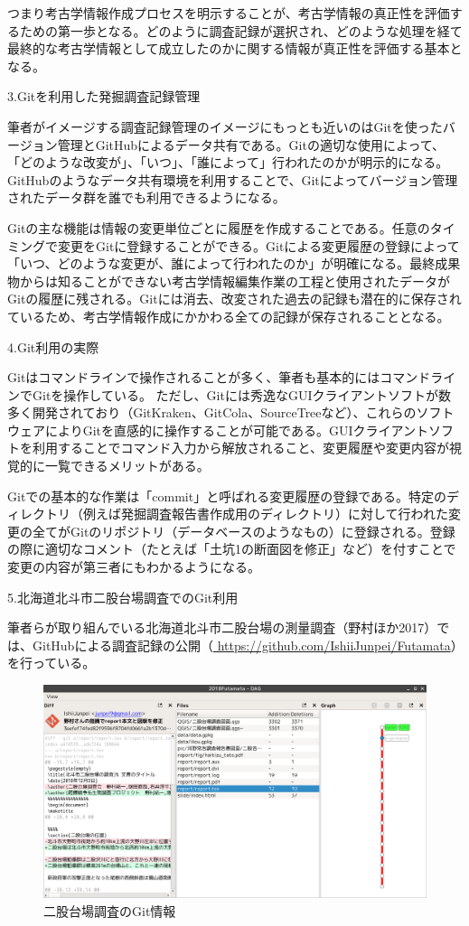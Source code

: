 \documentclass[9pt,b5j,papersize]{jsarticle}
\begin{document}
\begin{multicols}{2}
つまり考古学情報作成プロセスを明示することが、考古学情報の真正性を評価するための第一歩となる。どのように調査記録が選択され、どのような処理を経て最終的な考古学情報として成立したのかに関する情報が真正性を評価する基本となる。

\noindent
{\large 3.Gitを利用した発掘調査記録管理}

筆者がイメージする調査記録管理のイメージにもっとも近いのはGitを使ったバージョン管理とGitHubによるデータ共有である。Gitの適切な使用によって、「どのような改変が」、「いつ」、「誰によって」行われたのかが明示的になる。GitHubのようなデータ共有環境を利用することで、Gitによってバージョン管理されたデータ群を誰でも利用できるようになる。

Gitの主な機能は情報の変更単位ごとに履歴を作成することである。任意のタイミングで変更をGitに登録することができる。Gitによる変更履歴の登録によって「いつ、どのような変更が、誰によって行われたのか」が明確になる。最終成果物からは知ることができない考古学情報編集作業の工程と使用されたデータがGitの履歴に残される。Gitには消去、改変された過去の記録も潜在的に保存されているため、考古学情報作成にかかわる全ての記録が保存されることとなる。

\noindent
{\large 4.Git利用の実際}

Gitはコマンドラインで操作されることが多く、筆者も基本的にはコマンドラインでGitを操作している。
ただし、Gitには秀逸なGUIクライアントソフトが数多く開発されており（GitKraken、GitCola、SourceTreeなど）、これらのソフトウェアによりGitを直感的に操作することが可能である。GUIクライアントソフトを利用することでコマンド入力から解放されること、変更履歴や変更内容が視覚的に一覧できるメリットがある。

Gitでの基本的な作業は「commit」と呼ばれる変更履歴の登録である。特定のディレクトリ（例えば発掘調査報告書作成用のディレクトリ）に対して行われた変更の全てがGitのリポジトリ（データベースのようなもの）に登録される。登録の際に適切なコメント（たとえば「土坑1の断面図を修正」など）を付すことで変更の内容が第三者にもわかるようになる。

\noindent
{\large 5.北海道北斗市二股台場調査でのGit利用}

筆者らが取り組んでいる北海道北斗市二股台場の測量調査（野村ほか2017）では、GitHubによる調査記録の公開（\url{ https://github.com/IshiiJunpei/Futamata}）を行っている。

\begin{figure}[H]
\centering
\includegraphics[width=1\columnwidth]{01.png}
\caption{二股台場調査のGit情報}
\label{hutamata}
\end{figure}


\end{multicols}
\end{document}
